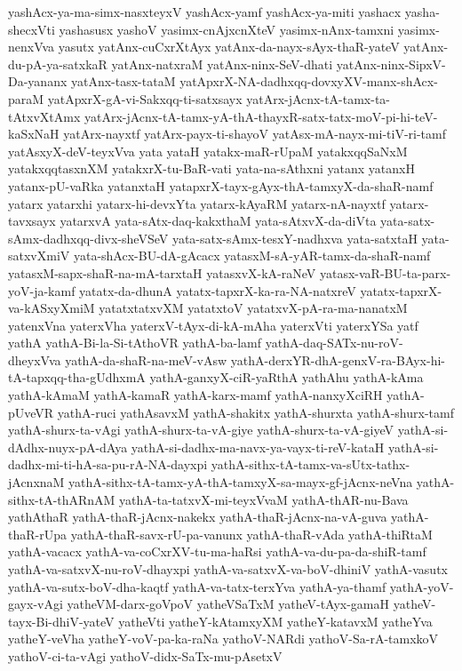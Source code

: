 {yashAcx-ya-ma-simx-nasxteyxV
yashAcx-yamf
yashAcx-ya-miti
yashacx
yasha-shecxVti
yashasusx
yashoV
yasimx-cnAjxcnXteV
yasimx-nAnx-tamxni
yasimx-nenxVva
yasutx
yatAnx-cuCxrXtAyx
yatAnx-da-nayx-sAyx-thaR-yateV
yatAnx-du-pA-ya-satxkaR
yatAnx-natxraM
yatAnx-ninx-SeV-dhati
yatAnx-ninx-SipxV-Da-yananx
yatAnx-tasx-tataM
yatApxrX-NA-dadhxqq-dovxyXV-manx-shAcx-paraM
yatApxrX-gA-vi-Sakxqq-ti-satxsayx
yatArx-jAcnx-tA-tamx-ta-tAtxvXtAmx
yatArx-jAcnx-tA-tamx-yA-thA-thayxR-satx-tatx-moV-pi-hi-teV-kaSxNaH
yatArx-nayxtf
yatArx-payx-ti-shayoV
yatAsx-mA-nayx-mi-tiV-ri-tamf
yatAsxyX-deV-teyxVva
yata
yataH
yatakx-maR-rUpaM
yatakxqqSaNxM
yatakxqqtasxnXM
yatakxrX-tu-BaR-vati
yata-na-sAthxni
yatanx
yatanxH
yatanx-pU-vaRka
yatanxtaH
yatapxrX-tayx-gAyx-thA-tamxyX-da-shaR-namf
yatarx
yatarxhi
yatarx-hi-devxYta
yatarx-kAyaRM
yatarx-nA-nayxtf
yatarx-tavxsayx
yatarxvA
yata-sAtx-daq-kakxthaM
yata-sAtxvX-da-diVta
yata-satx-sAmx-dadhxqq-divx-sheVSeV
yata-satx-sAmx-tesxY-nadhxva
yata-satxtaH
yata-satxvXmiV
yata-shAcx-BU-dA-gAcacx
yatasxM-sA-yAR-tamx-da-shaR-namf
yatasxM-sapx-shaR-na-mA-tarxtaH
yatasxvX-kA-raNeV
yatasx-vaR-BU-ta-parx-yoV-ja-kamf
yatatx-da-dhunA
yatatx-tapxrX-ka-ra-NA-natxreV
yatatx-tapxrX-va-kASxyXmiM
yatatxtatxvXM
yatatxtoV
yatatxvX-pA-ra-ma-nanatxM
yatenxVna
yaterxVha
yaterxV-tAyx-di-kA-mAha
yaterxVti
yaterxYSa
yatf
yathA
yathA-Bi-la-Si-tAthoVR
yathA-ba-lamf
yathA-daq-SATx-nu-roV-dheyxVva
yathA-da-shaR-na-meV-vAsw
yathA-derxYR-dhA-genxV-ra-BAyx-hi-tA-tapxqq-tha-gUdhxmA
yathA-ganxyX-ciR-yaRthA
yathAhu
yathA-kAma
yathA-kAmaM
yathA-kamaR
yathA-karx-mamf
yathA-nanxyXciRH
yathA-pUveVR
yathA-ruci
yathAsavxM
yathA-shakitx
yathA-shurxta
yathA-shurx-tamf
yathA-shurx-ta-vAgi
yathA-shurx-ta-vA-giye
yathA-shurx-ta-vA-giyeV
yathA-si-dAdhx-nuyx-pA-dAya
yathA-si-dadhx-ma-navx-ya-vayx-ti-reV-kataH
yathA-si-dadhx-mi-ti-hA-sa-pu-rA-NA-dayxpi
yathA-sithx-tA-tamx-va-sUtx-tathx-jAcnxnaM
yathA-sithx-tA-tamx-yA-thA-tamxyX-sa-mayx-gf-jAcnx-neVna
yathA-sithx-tA-thARnAM
yathA-ta-tatxvX-mi-teyxVvaM
yathA-thAR-nu-Bava
yathAthaR
yathA-thaR-jAcnx-nakekx
yathA-thaR-jAcnx-na-vA-guva
yathA-thaR-rUpa
yathA-thaR-savx-rU-pa-vanunx
yathA-thaR-vAda
yathA-thiRtaM
yathA-vacacx
yathA-va-coCxrXV-tu-ma-haRsi
yathA-va-du-pa-da-shiR-tamf
yathA-va-satxvX-nu-roV-dhayxpi
yathA-va-satxvX-va-boV-dhiniV
yathA-vasutx
yathA-va-sutx-boV-dha-kaqtf
yathA-va-tatx-terxYva
yathA-ya-thamf
yathA-yoV-gayx-vAgi
yatheVM-darx-goVpoV
yatheVSaTxM
yatheV-tAyx-gamaH
yatheV-tayx-Bi-dhiV-yateV
yatheVti
yatheY-kAtamxyXM
yatheY-katavxM
yatheYva
yatheY-veVha
yatheY-voV-pa-ka-raNa
yathoV-NARdi
yathoV-Sa-rA-tamxkoV
yathoV-ci-ta-vAgi
yathoV-didx-SaTx-mu-pAsetxV
}
